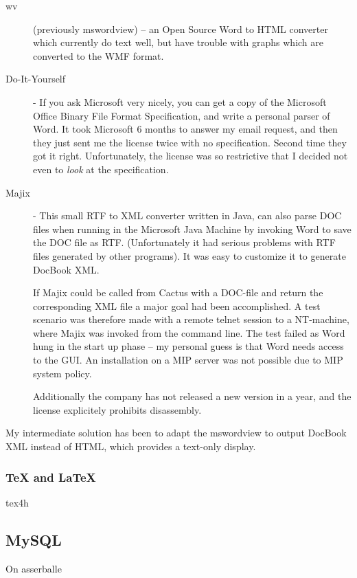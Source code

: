 \begin{description}
\item[wv] (previously mswordview) -- an Open Source Word to HTML
  converter which currently do text well, but have trouble with graphs
  which are converted to the WMF format.

\item[Do-It-Yourself] - If you ask Microsoft very nicely, you can get a
  copy of the Microsoft Office Binary File Format Specification, and
  write a personal parser of Word.  It took Microsoft 6 months to
  answer my email request, and then they just sent me the license
  twice with no specification.  Second time they got it right.
  Unfortunately, the license was so restrictive that I decided not
  even to \textit{look} at the specification.
  
\item[Majix] - This small RTF to XML converter written in Java, can
  also parse DOC files when running in the Microsoft Java Machine by
  invoking Word to save the DOC file as RTF.  (Unfortunately it had
  serious problems with RTF files generated by other programs).  It
  was easy to customize it to generate DocBook XML.
  
  If Majix could be called from Cactus with a DOC-file and return the
  corresponding XML file a major goal had been accomplished.  A test
  scenario was therefore made with a remote telnet session to a
  NT-machine, where Majix was invoked from the command line.  The test
  failed as Word hung in the start up phase -- my personal guess is
  that Word needs access to the GUI.  An installation on a MIP server
  was not possible due to MIP system policy.
  
  Additionally the company has not released a new version in a year,
  and the license explicitely prohibits disassembly. 

\end{description}

My intermediate solution has been to adapt the mswordview to output
DocBook XML instead of HTML, which provides a text-only
display.


\subsubsection{{\TeX} and {\LaTeX}}

\textsf{tex4h}


\subsection{MySQL}
On asserballe

